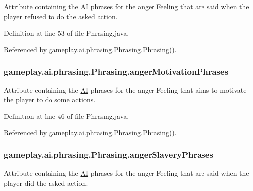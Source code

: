 Attribute containing the \hyperlink{a00001}{A\-I} phrases for the anger Feeling that are said when the player refused to do the asked action. 



Definition at line 53 of file Phrasing.\-java.



Referenced by gameplay.\-ai.\-phrasing.\-Phrasing.\-Phrasing().

\hypertarget{a00018_a2fb3c3c2b96efbc4afee915d58967130}{
\subsubsection[{anger\-Motivation\-Phrases}]{ gameplay.\-ai.\-phrasing.\-Phrasing.\-anger\-Motivation\-Phrases\hspace{0.3cm}{\ttfamily [protected]}}}\label{a00018_a2fb3c3c2b96efbc4afee915d58967130}


Attribute containing the \hyperlink{a00001}{A\-I} phrases for the anger Feeling that aims to motivate the player to do some actions. 



Definition at line 46 of file Phrasing.\-java.



Referenced by gameplay.\-ai.\-phrasing.\-Phrasing.\-Phrasing().

\hypertarget{a00018_a1c50856055990e9a1c22fd2b364bdf85}{
\subsubsection[{anger\-Slavery\-Phrases}]{ gameplay.\-ai.\-phrasing.\-Phrasing.\-anger\-Slavery\-Phrases\hspace{0.3cm}{\ttfamily [protected]}}}\label{a00018_a1c50856055990e9a1c22fd2b364bdf85}


Attribute containing the \hyperlink{a00001}{A\-I} phrases for the anger Feeling that are said when the player did the asked action. 




